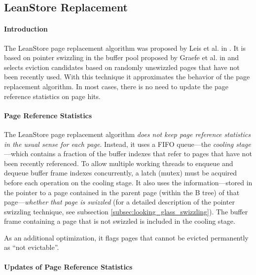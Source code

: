 
\subsection[LeanStore]{LeanStore Replacement} \label{subsec:leanstore}

\paragraph{Introduction}

    The LeanStore page replacement algorithm was proposed by Leis et al. in \cite{Leis:2018}. It is based on pointer swizzling in the buffer pool proposed by Graefe et al. in \cite{Graefe:2014} and selects eviction candidates based on randomly unswizzled pages that have not been recently used. With this technique it approximates the behavior of the  page replacement algorithm. In most cases, there is no need to update the page reference statistics on page hits.

\paragraph{Page Reference Statistics}

    The LeanStore page replacement algorithm \emph{does not keep page reference statistics in the usual sense for each page}. Instead, it uses a FIFO queue---the \emph{cooling stage}---which contains a fraction of the buffer indexes that refer to pages that have not been recently referenced. To allow multiple working threads to enqueue and dequeue buffer frame indexes concurrently, a latch (mutex) must be acquired before each operation on the cooling stage. It also uses the information---stored in the pointer to a page contained in the parent page (within the B tree) of that page---\emph{whether that page is swizzled} (for a detailed description of the pointer swizzling technique, see subsection \ref{subsec:looking_glass_swizzling}). The buffer frame containing a page that is not swizzled is included in the cooling stage.

    As an additional optimization, it flags pages that cannot be evicted permanently as ``not evictable''.

\paragraph{Updates of Page Reference Statistics}

